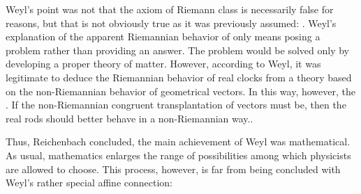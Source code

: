 \documentclass[draft]{article}
\begin{document}
%
%
Weyl's point was not that the axiom of Riemann class is necessarily false for \apr reasons, but that is not obviously true as it was previously assumed: . Weyl's explanation of the apparent Riemannian behavior of   \citep[368]{Reichenbach1922a} only means posing a problem rather than providing an answer. The problem would be solved only by developing a proper theory of matter. However, according to Weyl, it was legitimate to deduce the Riemannian behavior of real clocks from a theory based on the non-Riemannian behavior of geometrical vectors. In this way, however, the   \citep[368]{Reichenbach1922a}. If the non-Riemannian congruent transplantation of vectors must be, then the real rods should better behave in a non-Riemannian way.. 

Thus, Reichenbach concluded, the main achievement of Weyl was mathematical. As usual, mathematics enlarges the range of possibilities among which physicists are allowed to choose. This process, however, is  far from being concluded with Weyl's rather special affine connection:
\end{document}
